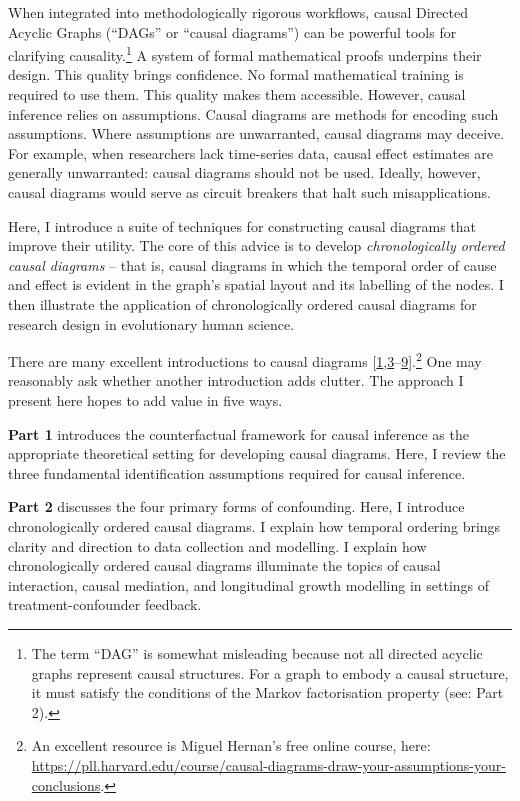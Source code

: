 \documentclass[
  singlecolumn]{article}
\begin{document}
When integrated into methodologically rigorous workflows, causal
Directed Acyclic Graphs (``DAGs'' or ``causal diagrams'') can be
powerful tools for clarifying causality.\footnote{The term ``DAG'' is
  somewhat misleading because not all directed acyclic graphs represent
  causal structures. For a graph to embody a causal structure, it must
  satisfy the conditions of the Markov factorisation property (see: Part
  2).} A system of formal mathematical proofs underpins their design.
This quality brings confidence. No formal mathematical training is
required to use them. This quality makes them accessible. However,
causal inference relies on assumptions. Causal diagrams are methods for
encoding such assumptions. Where assumptions are unwarranted, causal
diagrams may deceive. For example, when researchers lack time-series
data, causal effect estimates are generally unwarranted: causal diagrams
should not be used. Ideally, however, causal diagrams would serve as
circuit breakers that halt such misapplications.

Here, I introduce a suite of techniques for constructing causal diagrams
that improve their utility. The core of this advice is to develop
\emph{chronologically ordered causal diagrams} -- that is, causal
diagrams in which the temporal order of cause and effect is evident in
the graph's spatial layout and its labelling of the nodes. I then
illustrate the application of chronologically ordered causal diagrams
for research design in evolutionary human science.

There are many excellent introductions to causal diagrams
{[}\protect\hyperlink{ref-mcelreath2020}{1},\protect\hyperlink{ref-rohrer2018}{3}--\protect\hyperlink{ref-pearl2009}{9}{]}.\footnote{An
  excellent resource is Miguel Hernan's free online course, here:
  \url{https://pll.harvard.edu/course/causal-diagrams-draw-your-assumptions-your-conclusions}.}
One may reasonably ask whether another introduction adds clutter. The
approach I present here hopes to add value in five ways.

\textbf{Part 1} introduces the counterfactual framework for causal
inference as the appropriate theoretical setting for developing causal
diagrams. Here, I review the three fundamental identification
assumptions required for causal inference.

\textbf{Part 2} discusses the four primary forms of confounding. Here, I
introduce chronologically ordered causal diagrams. I explain how
temporal ordering brings clarity and direction to data collection and
modelling. I explain how chronologically ordered causal diagrams
illuminate the topics of causal interaction, causal mediation, and
longitudinal growth modelling in settings of treatment-confounder
feedback.
\end{document}
